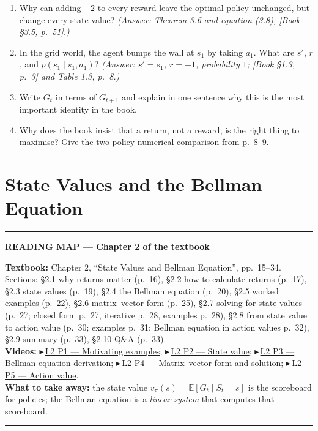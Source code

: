 \documentclass[11pt, letterpaper]{article}
\theoremstyle{runin}
\theoremstyle{runinplain}
\theoremstyle{remark}
\newcommand{\E}{\mathbb{E}}
\newcommand{\bkin}[1]{{\color{bookblue}\small[\textsf{Book #1}]}}
\newcommand{\vid}[2]{{\color{vidred}\small$\playbutton$\,\href{#2}{\textsf{#1}}}}
\newcommand{\playbutton}{\blacktriangleright}
\newenvironment{roadmap}[1]
  {\par\medskip\noindent\rule{\textwidth}{0.9pt}\par\nobreak\vspace{0.25em}
   \noindent\textbf{\small READING MAP --- #1}\par\nobreak\vspace{0.15em}
   \small}
  {\par\nobreak\vspace{0.25em}\noindent\rule{\textwidth}{0.9pt}\par\medskip}
\begin{document}
\begin{enumerate}
  \item Why can adding $-2$ to every reward leave the optimal policy unchanged, but
        change every state value? \emph{(Answer: Theorem 3.6 and equation (3.8),
        \bkin{\S3.5, p.~51}.)}
  \item In the grid world, the agent bumps the wall at $s_1$ by taking $a_1$. What
        are $s'$, $r$, and $p(s_1\mid s_1,a_1)$? \emph{(Answer: $s'=s_1$,
        $r=-1$, probability $1$; \bkin{\S1.3, p.~3} and Table 1.3, p.~8.)}
  \item Write $G_t$ in terms of $G_{t+1}$ and explain in one sentence why this is
        the most important identity in the book.
  \item Why does the book insist that a return, not a reward, is the right thing to
        maximise? Give the two-policy numerical comparison from p.~8--9.
\end{enumerate}

\newpage
\section{State Values and the Bellman Equation}

\begin{roadmap}{Chapter 2 of the textbook}
\textbf{Textbook:} Chapter 2, ``State Values and Bellman Equation'', pp.~15--34.
Sections: \S2.1 why returns matter (p.~16), \S2.2 how to calculate returns (p.~17),
\S2.3 state values (p.~19), \S2.4 the Bellman equation (p.~20), \S2.5 worked
examples (p.~22), \S2.6 matrix--vector form (p.~25), \S2.7 solving for state values
(p.~27; closed form p.~27, iterative p.~28, examples p.~28), \S2.8 from state value
to action value (p.~30; examples p.~31; Bellman equation in action values p.~32),
\S2.9 summary (p.~33), \S2.10 Q\&A (p.~33).\\[0.3em]
\textbf{Videos:}
\vid{L2 P1 --- Motivating examples}{https://www.youtube.com/watch?v=XCzWrlgZCwc};
\vid{L2 P2 --- State value}{https://www.youtube.com/watch?v=DSvi3xEN13I};
\vid{L2 P3 --- Bellman equation derivation}{https://www.youtube.com/watch?v=eNtId8yPWkA};
\vid{L2 P4 --- Matrix--vector form and solution}{https://www.youtube.com/watch?v=EtCfBG_eP2w};
\vid{L2 P5 --- Action value}{https://www.youtube.com/watch?v=zJo2sLDzfcU}.\\[0.3em]
\textbf{What to take away:} the state value $v_\pi(s)=\E[G_t\mid S_t=s]$ is the
scoreboard for policies; the Bellman equation is a \emph{linear system} that
computes that scoreboard.
\end{roadmap}
\end{document}
